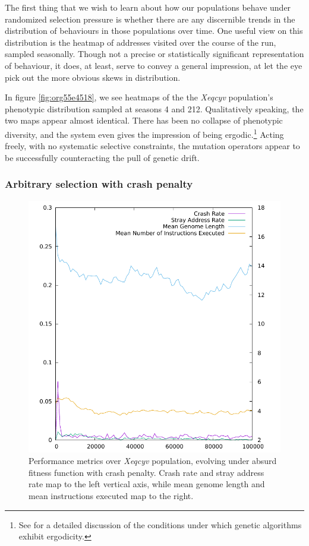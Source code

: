 \documentclass[12pt,glossary]{dalthesis}
\begin{document}
The first thing that we wish to learn about how our populations behave under
randomized selection pressure is whether there are any discernible 
trends in the distribution of behaviours in those populations over time. 
One useful view on this distribution is the heatmap of addresses visited over the
course of the run, sampled seasonally. Though not a precise or statistically
significant representation of behaviour, it does, at least, serve to convey a
general impression, at let the eye pick out the more obvious skews in distribution. 

In figure \ref{fig:org55e4518}, we see heatmaps of the the \emph{Xeqcyv} population's
phenotypic distribution sampled at seasons 4 and 212. Qualitatively speaking, the
two maps appear almost identical. There has been no collapse of phenotypic diversity,
and the system even gives the impression of being ergodic.\footnote{See \cite{schmitt01} for a detailed discussion of the conditions under which genetic algorithms exhibit ergodicity.} Acting freely, with
no systematic selective constraints, the mutation operators appear to be successfully
counteracting the pull of genetic drift. 


\subsubsection{Arbitrary selection with crash penalty}
\label{sec:org951b665}
\label{orgbc5867e}

\begin{figure}[htbp]
\centering
\includegraphics[width=.9\linewidth]{../images/plots/xeqcyv_kafka_performance.pdf}
\caption{\label{fig:orgeeee3cf}
Performance metrics over \emph{Xeqcyv} population, evolving under absurd fitness function with crash penalty. Crash rate and stray address rate map to the left vertical axis, while mean genome length and mean instructions executed map to the right.}
\end{figure}
\end{document}

